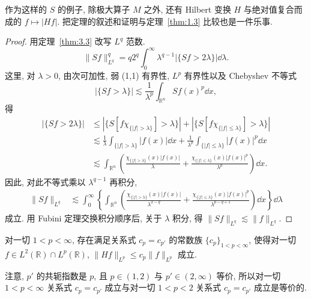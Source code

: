 作为这样的 $S$ 的例子, 除极大算子 $M$ 之外, 还有 Hilbert 变换 $H$ 与绝对值复合而成的 $f \mapsto |Hf|$. 把定理的叙述和证明与定理~\ref{thm:1.3} 比较也是一件乐事.

\begin{proof}
用定理~\ref{thm:3.3} 改写 $L^{q}$ 范数.
\begin{equation}\tag{4.30}
\|Sf\|_{L^{q}}^{q} = q2^{q}\int_{0}^{\infty}\lambda^{q-1}|\{Sf > 2\lambda\}|\dd\lambda.
\label{eq:4.30}
\end{equation}
这里, 对 $\lambda > 0$, 由次可加性, 弱 (1,1) 有界性, $L^{p}$ 有界性以及 Chebyshev 不等式
\[
|\{Sf > \lambda\}| \lesssim \frac{1}{\lambda^{p}}\int_{\mathbb{R}^{n}}Sf(x)^{p}\dd x,
\]
得
\begin{align*}
|\{Sf > 2\lambda\}| &\leq |\{S[f\chi_{\{|f| > \lambda\}}] > \lambda\}| + |\{S[f\chi_{\{|f| \leq \lambda\}}] > \lambda\}| \\
&\lesssim \frac{1}{\lambda}\int_{\{|f| > \lambda\}}|f(x)|\dd x + \frac{1}{\lambda^{p}}\int_{\{|f| \leq \lambda\}}|f(x)|^{p}\dd x \\
&\lesssim \int_{\mathbb{R}^{n}}\left(\frac{\chi_{\{|f| > \lambda\}}(x)|f(x)|}{\lambda} + \frac{\chi_{\{|f| \leq \lambda\}}(x)|f(x)|^{p}}{\lambda^{p}}\right)\dd x.
\end{align*}
因此, 对此不等式乘以 $\lambda^{q-1}$ 再积分,
\begin{align*}
\|Sf\|_{L^{q}} &\lesssim \int_{0}^{\infty}\left\{\int_{\mathbb{R}^{n}}\left(\frac{\chi_{\{|f| > \lambda\}}(x)|f(x)|}{\lambda^{2-q}} + \frac{\chi_{\{|f| \leq \lambda\}}(x)|f(x)|^{p}}{\lambda^{p-q+1}}\right)\dd x\right\}\dd\lambda
\end{align*}
成立. 用 Fubini 定理交换积分顺序后, 关于 $\lambda$ 积分, 得 $\|Sf\|_{L^{q}} \lesssim \|f\|_{L^{q}}$.
\end{proof}

\begin{theorem}\label{thm:4.6}
对一切 $1 < p < \infty$, 存在满足关系式 $c_{p} = c_{p'}$ 的常数族 $\{c_{p}\}_{1 < p < \infty}$, 使得对一切 $f \in L^{2}(\mathbb{R}) \cap L^{p}(\mathbb{R})$, $\|Hf\|_{L^{p}} \leq c_{p}\|f\|_{L^{p}}$ 成立.
\end{theorem}

注意, $p'$ 的共轭指数是 $p$, 且 $p \in (1, 2)$ 与 $p' \in (2, \infty)$ 等价, 所以对一切 $1 < p < \infty$ 关系式 $c_{p} = c_{p'}$ 成立与对一切 $1 < p < 2$ 关系式 $c_{p} = c_{p'}$ 成立是等价的.

